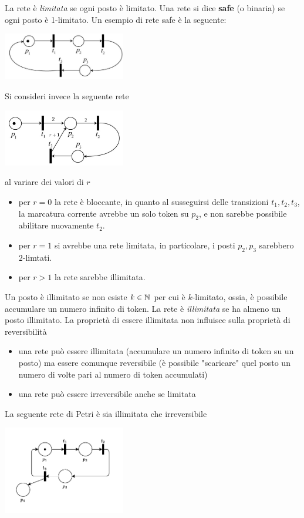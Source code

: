 \documentclass[10pt, letterpaper]{report}
\begin{document}
La rete è \textit{limitata} se ogni posto è limitato. Una rete si dice \textbf{safe} (o binaria) se ogni posto è 1-limitato.
Un esempio di rete safe è la seguente:
\begin{center}
    \includegraphics[width=0.4\textwidth]{images/safe.png}
\end{center}
Si consideri invece la seguente rete
\begin{center}
    \includegraphics[width=0.4\textwidth]{images/limitata.png}
\end{center}
al variare dei valori di $r$\begin{itemize}
    \item per $r=0$ la rete è bloccante, in quanto al susseguirsi delle transizioni $t_1,t_2,t_3$, la marcatura corrente avrebbe un solo token su $p_2$, e non sarebbe possibile abilitare nuovamente $t_2$.
    \item per $r=1$ si avrebbe una rete limitata, in particolare, i posti $p_2,p_3$ sarebbero $2$-limtati.
    \item per $r>1$ la rete sarebbe illimitata.
\end{itemize}
Un posto è illimitato se non esiste $k\in{\mathbb N}$ per cui è $k$-limitato, ossia, è possibile accumulare un numero infinito di token. La rete è \textit{illimitata} se ha almeno un posto illimitato.\acc 
La proprietà di essere illimitata non influisce sulla proprietà di reversibilità\begin{itemize}
    \item una rete può essere illimitata (accumulare un numero infinito di token su un posto) ma essere comunque reversibile (è possibile "scaricare" quel posto un numero di volte pari al numero di token accumulati)
    \item una rete può essere irreversibile anche se limitata
\end{itemize}
La seguente rete di Petri è sia illimitata che irreversibile
\begin{center}
    \includegraphics[width=0.4\textwidth]{images/illimitata.drawio.pdf}
\end{center}
\end{document}
